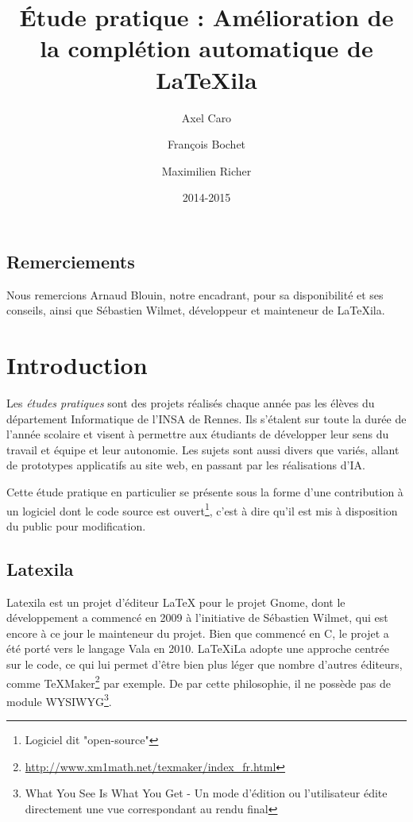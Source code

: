 \documentclass[a4paper,11pt]{report}
\title{Étude pratique : Amélioration de la complétion automatique de \LaTeX{}ila}
\author{Axel Caro\and François Bochet\and Maximilien Richer}
\date{2014-2015}
\begin{document}
\maketitle %
\tableofcontents %

\section{Remerciements} %
\label{sec:remerciements}
Nous remercions Arnaud Blouin, notre encadrant, pour sa disponibilité et ses conseils, ainsi que Sébastien Wilmet, développeur et mainteneur de LaTeXila.

\chapter{Introduction}
\label{cha:Introduction}
Les \textit{études pratiques} sont des projets réalisés chaque année pas les élèves du département Informatique de l'INSA de Rennes. Ils s'étalent sur toute la durée de l'année scolaire et visent à permettre aux étudiants de développer leur sens du travail et équipe et leur autonomie. Les sujets sont aussi divers que variés, allant de prototypes applicatifs au site web, en passant par les réalisations d'IA.

Cette étude pratique en particulier se présente sous la forme d'une contribution à un logiciel dont le code source est ouvert\footnote{Logiciel dit "open-source"}, c'est à dire qu'il est mis à disposition du public pour modification.

\section{Latexila}
\label{sec:latexila}
Latexila est un projet d'éditeur LaTeX pour le projet Gnome, dont le développement a commencé en 2009 à l'initiative de Sébastien Wilmet, qui est encore à ce jour le mainteneur du projet. Bien que commencé en C, le projet a été porté vers le langage Vala en 2010. LaTeXiLa adopte une approche centrée sur le code, ce qui lui permet d'être bien plus léger que nombre d'autres éditeurs, comme TeXMaker\footnote{\url{http://www.xm1math.net/texmaker/index_fr.html}} par exemple. De par cette philosophie, il ne possède pas de module WYSIWYG\footnote{What You See Is What You Get - Un mode d'édition ou l'utilisateur édite directement une vue correspondant au rendu final}.

%

\end{document}
